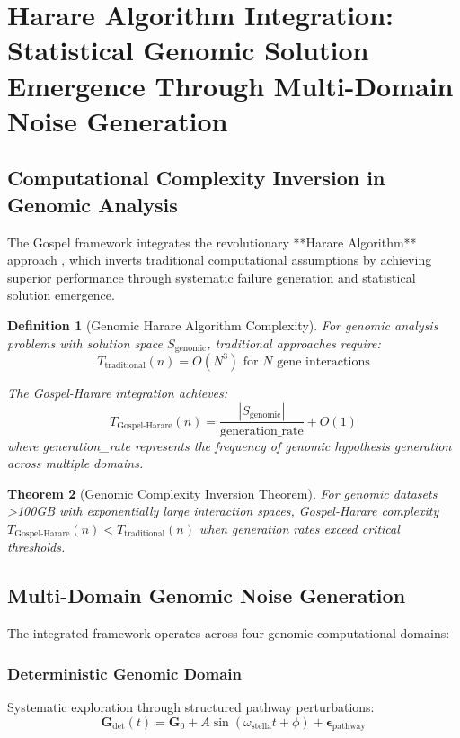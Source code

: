 \documentclass[12pt,a4paper]{article}
\newtheorem{theorem}{Theorem}[section]
\newtheorem{definition}[theorem]{Definition}
\begin{document}
\section{Harare Algorithm Integration: Statistical Genomic Solution Emergence Through Multi-Domain Noise Generation}

\subsection{Computational Complexity Inversion in Genomic Analysis}

The Gospel framework integrates the revolutionary **Harare Algorithm** approach \cite{sachikonye2025harare}, which inverts traditional computational assumptions by achieving superior performance through systematic failure generation and statistical solution emergence.

\begin{definition}[Genomic Harare Algorithm Complexity]
For genomic analysis problems with solution space $S_{\text{genomic}}$, traditional approaches require:
$$T_{\text{traditional}}(n) = O(N^3) \text{ for } N \text{ gene interactions}$$

The Gospel-Harare integration achieves:
$$T_{\text{Gospel-Harare}}(n) = \frac{|S_{\text{genomic}}|}{\text{generation\_rate}} + O(1)$$
where generation\_rate represents the frequency of genomic hypothesis generation across multiple domains.
\end{definition}

\begin{theorem}[Genomic Complexity Inversion Theorem]
For genomic datasets >100GB with exponentially large interaction spaces, Gospel-Harare complexity $T_{\text{Gospel-Harare}}(n) < T_{\text{traditional}}(n)$ when generation rates exceed critical thresholds.
\end{theorem}

\subsection{Multi-Domain Genomic Noise Generation}

The integrated framework operates across four genomic computational domains:

\subsubsection{Deterministic Genomic Domain}
Systematic exploration through structured pathway perturbations:
$$\mathbf{G}_{\text{det}}(t) = \mathbf{G}_0 + A \sin(\omega_{\text{stella}} t + \phi) + \boldsymbol{\epsilon}_{\text{pathway}}$$
\end{document}
